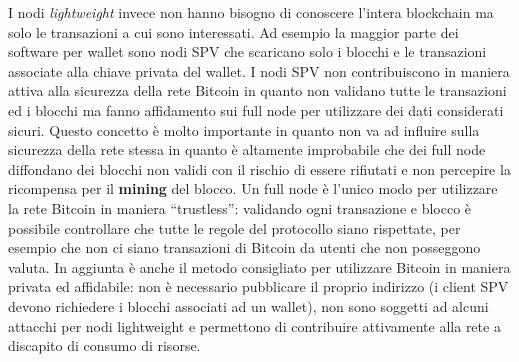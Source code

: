 I nodi \textit{lightweight} invece non hanno bisogno di conoscere l'intera blockchain ma solo le transazioni a cui sono interessati. Ad esempio la maggior parte dei software per wallet sono nodi SPV che scaricano solo i blocchi e le transazioni associate alla chiave privata del wallet.\newline
I nodi SPV non contribuiscono in maniera attiva alla sicurezza della rete Bitcoin in quanto non validano tutte le transazioni ed i blocchi ma fanno affidamento sui full node per utilizzare dei dati considerati sicuri. Questo concetto è molto importante in quanto non va ad influire sulla sicurezza della rete stessa in quanto è altamente improbabile che dei full node diffondano dei blocchi non validi con il rischio di essere rifiutati e non percepire la ricompensa per il \textbf{mining} del blocco.\newline
Un full node è l'unico modo per utilizzare la rete Bitcoin in maniera ``trustless'': validando ogni transazione e blocco è possibile controllare che tutte le regole del protocollo siano rispettate, per esempio che non ci siano transazioni di Bitcoin da utenti che non posseggono valuta. In aggiunta è anche il metodo consigliato per utilizzare Bitcoin in maniera privata ed affidabile: non è necessario pubblicare il proprio indirizzo (i client SPV devono richiedere i blocchi associati ad un wallet), non sono soggetti ad alcuni attacchi per nodi lightweight e permettono di contribuire attivamente alla rete a discapito di consumo di risorse.

